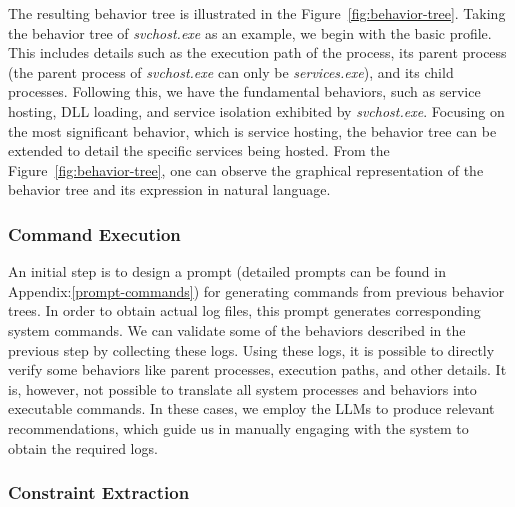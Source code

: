 The resulting behavior tree is illustrated in the Figure~\ref{fig:behavior-tree}. Taking the behavior tree of \textit{svchost.exe} as an example, we begin with the basic profile. This includes details such as the execution path of the process, its parent process (the parent process of \textit{svchost.exe} can only be \textit{services.exe}), and its child processes. Following this, we have the fundamental behaviors, such as service hosting, DLL loading, and service isolation exhibited by \textit{svchost.exe}. Focusing on the most significant behavior, which is service hosting, the behavior tree can be extended to detail the specific services being hosted. From the Figure~\ref{fig:behavior-tree}, one can observe the graphical representation of the behavior tree and its expression in natural language.


\subsubsection{Command Execution}

An initial step is to design a prompt (detailed prompts can be found in Appendix:\ref{prompt-commands}) for generating commands from previous behavior trees. In order to obtain actual log files, this prompt generates corresponding system commands. We can validate some of the behaviors described in the previous step by collecting these logs. Using these logs, it is possible to directly verify some behaviors like parent processes, execution paths, and other details. It is, however, not possible to translate all system processes and behaviors into executable commands. In these cases, we employ the LLMs to produce relevant recommendations, which guide us in manually engaging with the system to obtain the required logs.

\subsubsection{Constraint Extraction}

